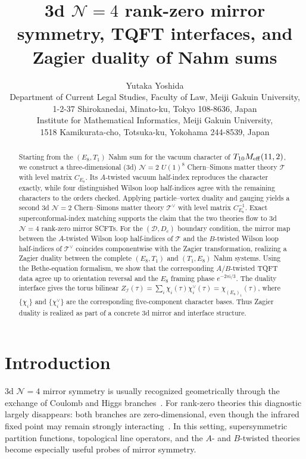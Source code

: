 \documentclass[11pt,a4paper]{article}
\title{\vspace*{1.8cm}\textbf{3d $\mathcal N=4$ rank-zero mirror symmetry, TQFT interfaces, and Zagier duality of Nahm sums}}
\author{Yutaka Yoshida\\[0.7em]
\small Department of Current Legal Studies, Faculty of Law, Meiji Gakuin University,\\
\small 1-2-37 Shirokanedai, Minato-ku, Tokyo 108-8636, Japan\\[0.45em]
\small Institute for Mathematical Informatics, Meiji Gakuin University,\\
\small 1518 Kamikurata-cho, Totsuka-ku, Yokohama 244-8539, Japan}
\date{}
\numberwithin{equation}{section}
\begin{document}
\maketitle

\begin{abstract}
Starting from the $(E_8,T_1)$ Nahm sum for the vacuum character of $T_{10}M_{\rm eff}(11,2)$, we construct a three-dimensional (3d) $\mathcal N=2$ $U(1)^8$ Chern--Simons matter theory $\mathcal T$ with level matrix $C_{E_8}$. Its $A$-twisted vacuum half-index reproduces the character exactly, while four distinguished Wilson loop half-indices agree with the remaining characters to the orders checked. Applying particle--vortex duality and gauging yields a second 3d $\mathcal N=2$ Chern--Simons matter theory $\mathcal T^\vee$ with level matrix $C_{E_8}^{-1}$. Exact superconformal-index matching supports the claim that the two theories flow to 3d $\mathcal N=4$ rank-zero mirror SCFTs. For the $(\mathcal D,D_c)$ boundary condition, the mirror map between the $A$-twisted Wilson loop half-indices of $\mathcal T$ and the $B$-twisted Wilson loop half-indices of $\mathcal T^\vee$ coincides componentwise with the Zagier transformation, realizing a Zagier duality between the complete $(E_8,T_1)$ and $(T_1,E_8)$ Nahm systems. Using the Bethe-equation formalism, we show that the corresponding $A/B$-twisted TQFT data agree up to orientation reversal and the $E_8$ framing phase $e^{-2\pi \mathrm{i}/3}$. The duality interface gives the torus bilinear
$Z_{\mathcal I}(\tau)=\sum_i\chi_i(\tau)\chi_i^\vee(\tau)=\chi_{(E_8)_1}(\tau)$,
where $\{\chi_i\}$ and $\{\chi_i^\vee\}$ are the corresponding five-component character bases. Thus Zagier duality is realized as part of a concrete 3d mirror and interface structure.
\end{abstract}


\clearpage
\tableofcontents

\section{Introduction}
\label{sec:introduction}

3d $\mathcal N=4$ mirror symmetry is usually recognized geometrically through the exchange of Coulomb and Higgs branches~\cite{Intriligator:1996ex,Hanany:1996ie,deBoer:1996mp}.  For rank-zero theories this diagnostic largely disappears: both branches are zero-dimensional, even though the infrared fixed point may remain strongly interacting~\cite{Gang:2018huc,Gang:2023rei,Gang:2021hrd}.  In this setting, supersymmetric partition functions, topological line operators, and the $A$- and $B$-twisted theories become especially useful probes of mirror symmetry.
\end{document}
